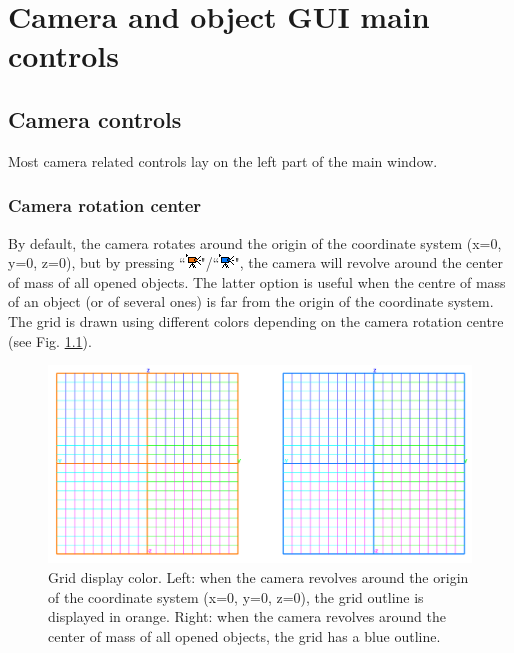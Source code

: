 \chapter{Camera and object GUI main controls}
\minitoc  


 \section{Camera controls}
Most camera related controls lay on the left part of the main window.
\subsection{Camera rotation center}
By default, the camera rotates around the origin of the coordinate system (x=0, y=0, z=0), but by pressing ``\includegraphics[scale=0.7]{images/06/camera/move_cam.png}"/``\includegraphics[scale=0.7]{images/06/camera/move_cam2.png}", the camera will revolve around the center of mass of all opened objects. The latter option is useful when the centre of mass of an object (or of several ones) is far from the origin of the coordinate system. The grid is drawn using different colors depending on the camera rotation centre (see Fig. \ref{grid_color}). %

\begin{figure}
  \centering
  \includegraphics[scale=0.4]{images/06/camera/grids.png} 
	\caption{Grid display color. Left: when the camera revolves around the origin of the coordinate system (x=0, y=0, z=0), the grid outline is displayed in orange. Right: when the camera revolves around the center of mass of all opened objects, the grid has a blue outline.}
\label{grid_color}
 
\end{figure}

